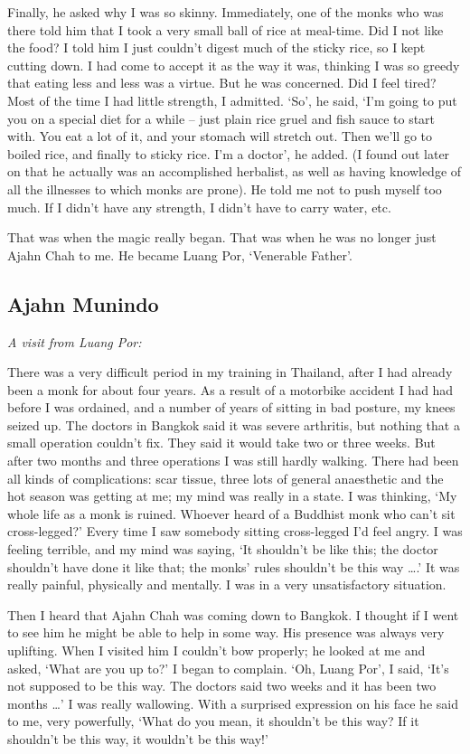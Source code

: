 Finally, he asked why I was so skinny. Immediately, one of the monks who
was there told him that I took a very small ball of rice at meal-time. 
Did I not like the food? I told him I just couldn't digest much of the
sticky rice, so I kept cutting down. I had come to accept it as the way
it was, thinking I was so greedy that eating less and less was a virtue. 
But he was concerned. Did I feel tired? Most of the time I had little
strength, I admitted. `So', he said, `I'm going to put you on a special
diet for a while -- just plain rice gruel and fish sauce to start with. 
You eat a lot of it, and your stomach will stretch out. Then we'll go to
boiled rice, and finally to sticky rice. I'm a doctor', he added. (I
found out later on that he actually was an accomplished herbalist, as
well as having knowledge of all the illnesses to which monks are prone). 
He told me not to push myself too much. If I didn't have any strength, I
didn't have to carry water, etc. 

That was when the magic really began. That was when he was no longer
just Ajahn Chah to me. He became Luang Por, `Venerable Father'. 

\subsection{Ajahn Munindo}

\emph{A visit from Luang Por:}

There was a very difficult period in my training in Thailand, after I
had already been a monk for about four years. As a result of a motorbike
accident I had had before I was ordained, and a number of years of
sitting in bad posture, my knees seized up. The doctors in Bangkok said
it was severe arthritis, but nothing that a small operation couldn't
fix. They said it would take two or three weeks. But after two months
and three operations I was still hardly walking. There had been all
kinds of complications: scar tissue, three lots of general anaesthetic
and the hot season was getting at me; my mind was really in a state. I
was thinking, `My whole life as a monk is ruined. Whoever heard of a
Buddhist monk who can't sit cross-legged?' Every time I saw somebody
sitting cross-legged I'd feel angry. I was feeling terrible, and my mind
was saying, `It shouldn't be like this; the doctor shouldn't have done
it like that; the monks' rules shouldn't be this way \ldots{}.' It was
really painful, physically and mentally. I was in a very unsatisfactory
situation. 

Then I heard that Ajahn Chah was coming down to Bangkok. I thought if I
went to see him he might be able to help in some way. His presence was
always very uplifting. When I visited him I couldn't bow properly; he
looked at me and asked, `What are you up to?' I began to complain. `Oh, 
Luang Por', I said, `It's not supposed to be this way. The doctors said
two weeks and it has been two months \ldots{}' I was really wallowing. 
With a surprised expression on his face he said to me, very powerfully, 
`What do you mean, it shouldn't be this way? If it shouldn't be
this way, it wouldn't be this way!'

